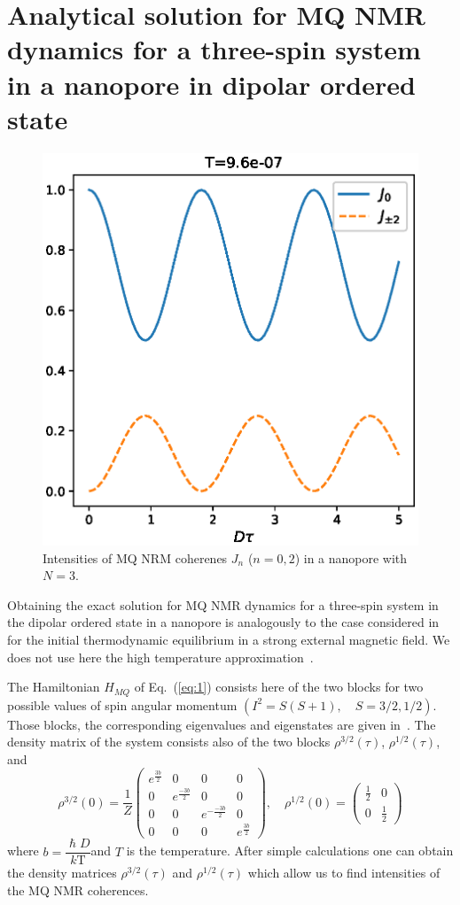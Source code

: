 \documentclass[review]{elsarticle}
\begin{document}
\section{Analytical solution for MQ NMR dynamics for a three-spin system in a nanopore in dipolar ordered state}
\label{sec:3}

\begin{figure}
    \centering
  	\includegraphics[width=0.5\linewidth]{coherences_n3_beta5.eps}
	\caption{
	    Intensities of MQ NRM coherenes $J_{n}$ ($n=0, 2$) in a nanopore with $N=3$.
	}
	\label{fig:1}
\end{figure}

Obtaining the exact solution for MQ NMR dynamics for a three-spin system in the dipolar ordered state in a nanopore is analogously to the case considered in~\cite{Doronin_2019} for the initial thermodynamic equilibrium in a strong external magnetic field. 
We does not use here the high temperature approximation~\cite{Goldman_1970}.

The Hamiltonian $H_{MQ}$ of Eq.~(\ref{eq:1}) consists here of the two blocks for two possible values of spin angular momentum $(I^2 = S(S+1),  \quad S=3/2,1/2)$.
Those blocks, the corresponding eigenvalues and eigenstates are given in~\cite{Doronin_2019}.
The density matrix of the system consists also of the two blocks $\rho^{3/2}(\tau)$, $\rho^{1/2}(\tau)$, and 
%
\begin{equation}
    \label{eq:15} 
    \rho^{3/2}(0) = \dfrac 1 Z
    \begin{pmatrix}
        e^{\frac{3b}{2}} & 0 & 0 & 0 
        \\
        0 & e^{\frac{-3b}{2}} & 0 & 0 
        \\
        0 & 0 & e^{-\frac{-3b}{2}} & 0 
        \\
        0 & 0 & 0 & e^{\frac{3b}{2}}
    \end{pmatrix}, 
    \quad
    \rho^{1/2}(0) = 
    \begin{pmatrix}
        \frac 1 2 & 0 
        \\
        0 & \frac 1 2
    \end{pmatrix}
\end{equation}
%
where $b = \dfrac{\hslash D}{k\mathrm{T}}$and $T$ is the temperature.
After simple calculations one can obtain the density matrices $\rho^{3/2}(\tau)$ and $\rho^{1/2}(\tau)$ 
which allow us to find intensities of the MQ NMR coherences.
\end{document}
